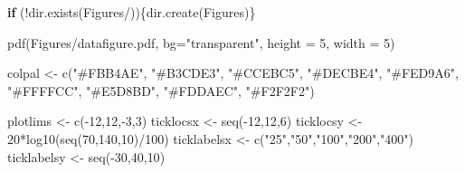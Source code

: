 \documentclass[
]{article}
\newenvironment{Shaded}{\begin{snugshade}}{\end{snugshade}}
\newcommand{\AttributeTok}[1]{\textcolor[rgb]{0.77,0.63,0.00}{#1}}
\newcommand{\ControlFlowTok}[1]{\textcolor[rgb]{0.13,0.29,0.53}{\textbf{#1}}}
\newcommand{\DecValTok}[1]{\textcolor[rgb]{0.00,0.00,0.81}{#1}}
\newcommand{\FunctionTok}[1]{\textcolor[rgb]{0.00,0.00,0.00}{#1}}
\newcommand{\NormalTok}[1]{#1}
\newcommand{\OtherTok}[1]{\textcolor[rgb]{0.56,0.35,0.01}{#1}}
\newcommand{\SpecialCharTok}[1]{\textcolor[rgb]{0.00,0.00,0.00}{#1}}
\newcommand{\StringTok}[1]{\textcolor[rgb]{0.31,0.60,0.02}{#1}}
\begin{document}
\begin{Shaded}
\begin{Highlighting}[]
\ControlFlowTok{if}\NormalTok{ (}\SpecialCharTok{!}\FunctionTok{dir.exists}\NormalTok{(}\StringTok{\textquotesingle{}Figures/\textquotesingle{}}\NormalTok{))\{}\FunctionTok{dir.create}\NormalTok{(}\StringTok{\textquotesingle{}Figures\textquotesingle{}}\NormalTok{)\}}

\FunctionTok{pdf}\NormalTok{(}\StringTok{\textquotesingle{}Figures/datafigure.pdf\textquotesingle{}}\NormalTok{, }\AttributeTok{bg=}\StringTok{"transparent"}\NormalTok{, }\AttributeTok{height =} \DecValTok{5}\NormalTok{, }\AttributeTok{width =} \DecValTok{5}\NormalTok{)}

\NormalTok{colpal }\OtherTok{\textless{}{-}} \FunctionTok{c}\NormalTok{(}\StringTok{"\#FBB4AE"}\NormalTok{, }\StringTok{"\#B3CDE3"}\NormalTok{, }\StringTok{"\#CCEBC5"}\NormalTok{, }\StringTok{"\#DECBE4"}\NormalTok{, }\StringTok{"\#FED9A6"}\NormalTok{, }\StringTok{"\#FFFFCC"}\NormalTok{, }\StringTok{"\#E5D8BD"}\NormalTok{, }\StringTok{"\#FDDAEC"}\NormalTok{, }\StringTok{"\#F2F2F2"}\NormalTok{)}

\NormalTok{plotlims }\OtherTok{\textless{}{-}} \FunctionTok{c}\NormalTok{(}\SpecialCharTok{{-}}\DecValTok{12}\NormalTok{,}\DecValTok{12}\NormalTok{,}\SpecialCharTok{{-}}\DecValTok{3}\NormalTok{,}\DecValTok{3}\NormalTok{) }
\NormalTok{ticklocsx }\OtherTok{\textless{}{-}} \FunctionTok{seq}\NormalTok{(}\SpecialCharTok{{-}}\DecValTok{12}\NormalTok{,}\DecValTok{12}\NormalTok{,}\DecValTok{6}\NormalTok{)   }
\NormalTok{ticklocsy }\OtherTok{\textless{}{-}} \DecValTok{20}\SpecialCharTok{*}\FunctionTok{log10}\NormalTok{(}\FunctionTok{seq}\NormalTok{(}\DecValTok{70}\NormalTok{,}\DecValTok{140}\NormalTok{,}\DecValTok{10}\NormalTok{)}\SpecialCharTok{/}\DecValTok{100}\NormalTok{)   }
\NormalTok{ticklabelsx }\OtherTok{\textless{}{-}} \FunctionTok{c}\NormalTok{(}\StringTok{"25"}\NormalTok{,}\StringTok{"50"}\NormalTok{,}\StringTok{"100"}\NormalTok{,}\StringTok{"200"}\NormalTok{,}\StringTok{"400"}\NormalTok{)      }
\NormalTok{ticklabelsy }\OtherTok{\textless{}{-}} \FunctionTok{seq}\NormalTok{(}\SpecialCharTok{{-}}\DecValTok{30}\NormalTok{,}\DecValTok{40}\NormalTok{,}\DecValTok{10}\NormalTok{)   }


\end{Highlighting}
\end{Shaded}
\end{document}
